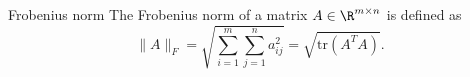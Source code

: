 \begin{ex}{Frobenius norm}
    The Frobenius norm of a matrix $A \in \R^{m \times n}$ is defined as
    \begin{equation*}
        \|A\|_F = \sqrt{\sum_{i=1}^m \sum_{j=1}^n a_{ij}^2} = \sqrt{\text{tr}(A^T A)}.
    \end{equation*}
    \vspace{-0.5cm}
\end{ex}

